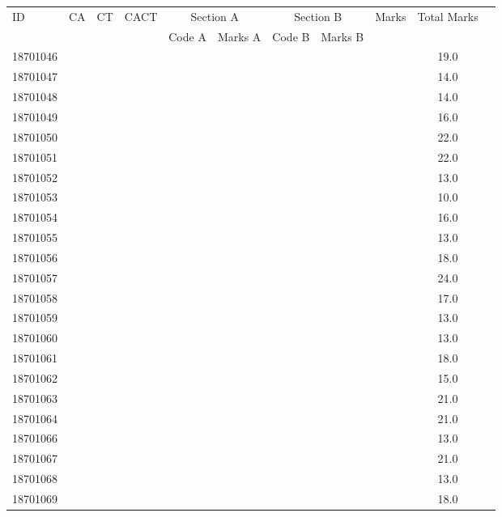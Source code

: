 \documentclass[12pt]{article}
\begin{document}
    \begin{center} 
	\renewcommand{\arraystretch}{1.08}
	\begin{small}
    \begin{tabular}{|l|c|c|c|c|c|c|c|c|c|c|} \hline
	\multirow{2}{*}{ID} & 	\multirow{2}{*}{CA}  & 	\multirow{2}{*}{CT}  & 	\multirow{2}{*}{CACT}  & \multicolumn{2 }{|c|}{Section A}& \multicolumn{2 }{c|}{Section B} & 	\multirow{2}{*}{Marks}  & 	\multirow{2}{*}{Total Marks}  \\ 
	&  &  &  & Code A & Marks A & Code B & Marks B&  &  \\ \hline
18701046 &  &  &  &  &  &  &  &  & 19.0\\ \hline 
18701047 &  &  &  &  &  &  &  &  & 14.0\\ \hline 
18701048 &  &  &  &  &  &  &  &  & 14.0\\ \hline 
18701049 &  &  &  &  &  &  &  &  & 16.0\\ \hline 
18701050 &  &  &  &  &  &  &  &  & 22.0\\ \hline 
18701051 &  &  &  &  &  &  &  &  & 22.0\\ \hline 
18701052 &  &  &  &  &  &  &  &  & 13.0\\ \hline 
18701053 &  &  &  &  &  &  &  &  & 10.0\\ \hline 
18701054 &  &  &  &  &  &  &  &  & 16.0\\ \hline 
18701055 &  &  &  &  &  &  &  &  & 13.0\\ \hline 
18701056 &  &  &  &  &  &  &  &  & 18.0\\ \hline 
18701057 &  &  &  &  &  &  &  &  & 24.0\\ \hline 
18701058 &  &  &  &  &  &  &  &  & 17.0\\ \hline 
18701059 &  &  &  &  &  &  &  &  & 13.0\\ \hline 
18701060 &  &  &  &  &  &  &  &  & 13.0\\ \hline 
18701061 &  &  &  &  &  &  &  &  & 18.0\\ \hline 
18701062 &  &  &  &  &  &  &  &  & 15.0\\ \hline 
18701063 &  &  &  &  &  &  &  &  & 21.0\\ \hline 
18701064 &  &  &  &  &  &  &  &  & 21.0\\ \hline 
18701066 &  &  &  &  &  &  &  &  & 13.0\\ \hline 
18701067 &  &  &  &  &  &  &  &  & 21.0\\ \hline 
18701068 &  &  &  &  &  &  &  &  & 13.0\\ \hline 
18701069 &  &  &  &  &  &  &  &  & 18.0\\ \hline 

\end{tabular}
\end{small}
\end{center}
\end{document}
